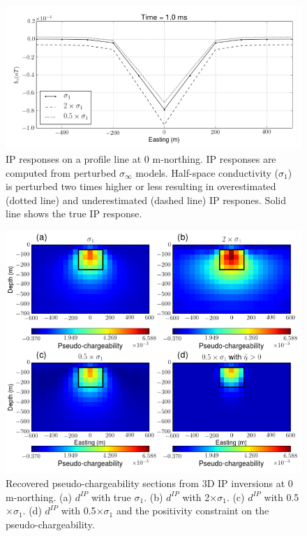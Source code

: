 \documentclass[a4paper, 11pt]{article}
\newcommand{\siginf}{\sigma_\infty}
\newcommand{\dip}{d^{IP}}
\begin{document}
\begin{figure}[htb]
  \centering
  \includegraphics[width=1.\textwidth]{figures/Reg_IPresp.png}
  \caption{IP responses on a profile line at 0 m-northing.  IP responses are computed from perturbed $\siginf$ models. Half-space conductivity ($\sigma_1$) is perturbed two times higher or less resulting in overestimated (dotted line) and underestimated (dashed line) IP respones. Solid line shows the true IP response. }
  \label{F:Reg_IPresp}
\end{figure}

\begin{figure}[htb]
  \centering
  \includegraphics[width=1.\textwidth]{figures/Regional_IPInv.png}
  \caption{Recovered pseudo-chargeability sections from 3D IP inversions at 0 m-northing. (a) $\dip$ with true $\sigma_1$. (b) $\dip$ with 2$\times \sigma_1$. (c) $\dip$ with 0.5$\times \sigma_1$. (d) $\dip$ with 0.5$\times \sigma_1$ and the positivity constraint on the pseudo-chargeability.}
  \label{F:Regional_IPInv}
\end{figure}
\end{document}
